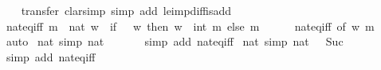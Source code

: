 \begin{isabellebody}
%
\isadelimproof
\ \ %
\endisadelimproof
%
\isatagproof
{}\isamarkupfalse%
\ transfer\ {\isacharparenleft}{\kern0pt}clarsimp\ simp\ add{\isacharcolon}{\kern0pt}\ le{\isacharunderscore}{\kern0pt}imp{\isacharunderscore}{\kern0pt}diff{\isacharunderscore}{\kern0pt}is{\isacharunderscore}{\kern0pt}add{\isacharparenright}{\kern0pt}%
\endisatagproof
{\isafoldproof}%
%
\isadelimproof
\isanewline
%
\endisadelimproof
\isanewline
{}\isamarkupfalse%
\ nat{\isacharunderscore}{\kern0pt}eq{\isacharunderscore}{\kern0pt}iff{}{\isacharcolon}{\kern0pt}\ {\isachardoublequoteopen}m\ {\isacharequal}{\kern0pt}\ nat\ w\ {\isasymlongleftrightarrow}\ {\isacharparenleft}{\kern0pt}if\ {}\ {\isasymle}\ w\ then\ w\ {\isacharequal}{\kern0pt}\ int\ m\ else\ m\ {\isacharequal}{\kern0pt}\ {}{\isacharparenright}{\kern0pt}{\isachardoublequoteclose}\isanewline
%
\isadelimproof
\ \ %
\endisadelimproof
%
\isatagproof
{}\isamarkupfalse%
\ nat{\isacharunderscore}{\kern0pt}eq{\isacharunderscore}{\kern0pt}iff\ {\isacharbrackleft}{\kern0pt}of\ w\ m{\isacharbrackright}{\kern0pt}\ \isamarkupfalse%
\ auto%
\endisatagproof
{\isafoldproof}%
%
\isadelimproof
\isanewline
%
\endisadelimproof
\isanewline
{}\isamarkupfalse%
\ nat{\isacharunderscore}{\kern0pt}{}\ {\isacharbrackleft}{\kern0pt}simp{\isacharbrackright}{\kern0pt}{\isacharcolon}{\kern0pt}\ {\isachardoublequoteopen}nat\ {}\ {\isacharequal}{\kern0pt}\ {}{\isachardoublequoteclose}\isanewline
%
\isadelimproof
\ \ %
\endisadelimproof
%
\isatagproof
{}\isamarkupfalse%
\ {\isacharparenleft}{\kern0pt}simp\ add{\isacharcolon}{\kern0pt}\ nat{\isacharunderscore}{\kern0pt}eq{\isacharunderscore}{\kern0pt}iff{\isacharparenright}{\kern0pt}%
\endisatagproof
{\isafoldproof}%
%
\isadelimproof
\isanewline
%
\endisadelimproof
\isanewline
{}\isamarkupfalse%
\ nat{\isacharunderscore}{\kern0pt}{}\ {\isacharbrackleft}{\kern0pt}simp{\isacharbrackright}{\kern0pt}{\isacharcolon}{\kern0pt}\ {\isachardoublequoteopen}nat\ {}\ {\isacharequal}{\kern0pt}\ Suc\ {}{\isachardoublequoteclose}\isanewline
%
\isadelimproof
\ \ %
\endisadelimproof
%
\isatagproof
{}\isamarkupfalse%
\ {\isacharparenleft}{\kern0pt}simp\ add{\isacharcolon}{\kern0pt}\ nat{\isacharunderscore}{\kern0pt}eq{\isacharunderscore}{\kern0pt}iff{\isacharparenright}{\kern0pt}%
\endisatagproof
{\isafoldproof}%
%
\isadelimproof
\isanewline
%
\endisadelimproof
\isanewline
{}\isamarkupfalse%

\end{isabellebody}
